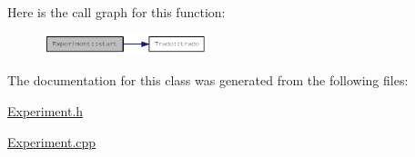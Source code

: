 Here is the call graph for this function:\nopagebreak
\begin{figure}[H]
\begin{center}
\leavevmode
\includegraphics[width=135pt]{classExperiment_ab15fca04be9b7bcad65b264b23b4a499_cgraph}
\end{center}
\end{figure}


The documentation for this class was generated from the following files:\begin{DoxyCompactItemize}
\item 
\hyperlink{Experiment_8h}{Experiment.h}\item 
\hyperlink{Experiment_8cpp}{Experiment.cpp}\end{DoxyCompactItemize}
